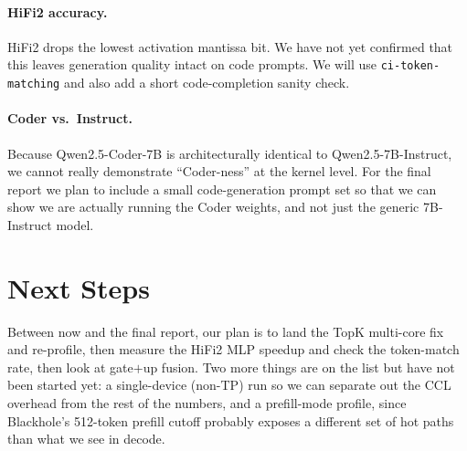 \documentclass[sigplan,nonacm,review]{acmart}
\begin{document}
\paragraph{HiFi2 accuracy.} HiFi2 drops the lowest activation mantissa
bit. We have not yet confirmed that this leaves generation quality
intact on code prompts. We will use \texttt{ci-token-matching} and also
add a short code-completion sanity check.

\paragraph{Coder vs.\ Instruct.} Because Qwen2.5-Coder-7B is
architecturally identical to Qwen2.5-7B-Instruct, we cannot really
demonstrate ``Coder-ness'' at the kernel level. For the final report
we plan to include a small code-generation prompt set so that we can
show we are actually running the Coder weights, and not just the
generic 7B-Instruct model.

\section{Next Steps}
Between now and the final report, our plan is to land the TopK
multi-core fix and re-profile, then measure the HiFi2 MLP speedup and
check the token-match rate, then look at gate${+}$up fusion. Two more
things are on the list but have not been started yet: a single-device
(non-TP) run so we can separate out the CCL overhead from the rest of
the numbers, and a prefill-mode profile, since Blackhole's 512-token
prefill cutoff probably exposes a different set of hot paths than what
we see in decode.

\balance


\end{document}
